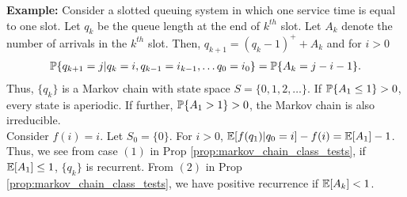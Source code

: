 \documentclass[all-lectures.tex]{subfiles}
\begin{document}
\indent \textbf{Example:} Consider a slotted queuing system in which one service time is equal to one slot. Let $q_k$ be the queue length at the end of $k^{th}$ slot. Let $A_k$ denote the number of arrivals in the $k^{th}$ slot. Then, $q_{k+1} = (q_k -1)^+ + A_{k}$ and for $i>0$
\begin{align*}
\P\{q_{k+1} = j|q_k = i,q_{k-1} = i_{k-1}, \dots q_0 = i_0\} = \P\{A_k = j-i-1\}.
\end{align*}
Thus, $\{q_k\}$ is a Markov chain with state space $S = \{0,1,2,\dots\}$. If $\P\{A_1 \leq 1\} > 0$, every state is aperiodic. If further, $\P\{A_1 > 1\} >0$, the Markov chain is also irreducible. \\
\indent Consider $f(i) = i$. Let $S_0 = \{0\}$. For $i> 0$, $\E[f(q_1)|q_0 = i] - f(i) = \E[A_1] -1 $. Thus, we see from case $(1)$ in Prop \ref{prop:markov_chain_class_tests}, if $\E[A_1] \leq 1 $, $\{q_k\}$ is recurrent. From $(2)$ in Prop \ref{prop:markov_chain_class_tests}, we have positive recurrence if $\E[A_k] < 1$. \\
\end{document}
